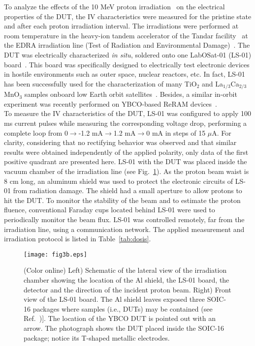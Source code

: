 \documentclass[square,aip,preprint,showkeys,superscriptaddress]{revtex4}
\begin{document}
To analyze the effects of the 10 MeV proton irradiation~\cite{SolarRadHandbook} on the electrical properties of the DUT, the IV characteristics were measured for the pristine state and after each proton irradiation interval. The irradiations were performed at room temperature in the heavy-ion tandem accelerator of the Tandar facility~\cite{Tandar} at the EDRA irradiation line (Test of Radiation and Environmental Damage)~\cite{Ibarra19}.  The DUT was electrically characterized {\textit{in situ}}, soldered onto one LabOSat-01 (LS-01) board~\cite{Barella16}. This board was specifically designed to electrically test electronic devices in hostile environments such as outer space, nuclear reactors, etc. In fact, LS-01 has been successfully used for the characterization of many TiO$_2$ and La$_{1/3}$Ca$_{2/3}$MnO$_3$ samples onboard low Earth orbit satellites~\cite{Sanca17,Barella19}. Besides, a similar in-orbit experiment was recently performed on YBCO-based ReRAM devices~\cite{Acha20}. \\

To measure the IV characteristics of the DUT, LS-01 was configured to apply 100 ms current pulses while measuring the corresponding voltage drop,  performing a complete loop from 0$\rightarrow$-1.2 mA$\rightarrow$1.2 mA$\rightarrow$0 mA in steps of 15 $\mu$A. For clarity, considering that no rectifying behavior was observed and that similar results were obtained independently of the applied polarity, only data of the first positive quadrant are presented here. LS-01 with the DUT was placed inside the vacuum chamber of the irradiation line (see Fig.~\ref{fig:chamber}). As the proton beam waist is 8 cm long, an aluminum shield was used to protect the electronic circuits of LS-01 from radiation damage. The shield had a small aperture to allow protons to hit the DUT. To monitor the stability of the beam and to estimate the proton fluence, conventional Faraday cups located behind LS-01 were used to periodically monitor the beam flux. LS-01 was controlled remotely, far from the irradiation line, using a communication network.  The applied measurement and irradiation protocol is listed in Table~\ref{tab:dosis}.


\begin{figure} [htb]
	\vspace{-2mm}
	\centerline{\texttt{[image: fig3b.eps]}}
	\vspace{-0mm}\caption{(Color online) Left) Schematic of the lateral view of the irradiation chamber showing the location of the Al shield, the LS-01 board, the detector and the direction of the incident proton beam. Right) Front view of the LS-01 board. The Al shield leaves exposed three SOIC-16 packages where samples (i.e., DUTs) may be contained (see Ref.~\cite{Barella16})]. The location of the YBCO DUT is pointed out with an arrow. The photograph shows the DUT placed inside the SOIC-16 package; notice its T-shaped metallic electrodes. } 
	\vspace{-0mm}
	\label{fig:chamber}
\end{figure}
\end{document}
